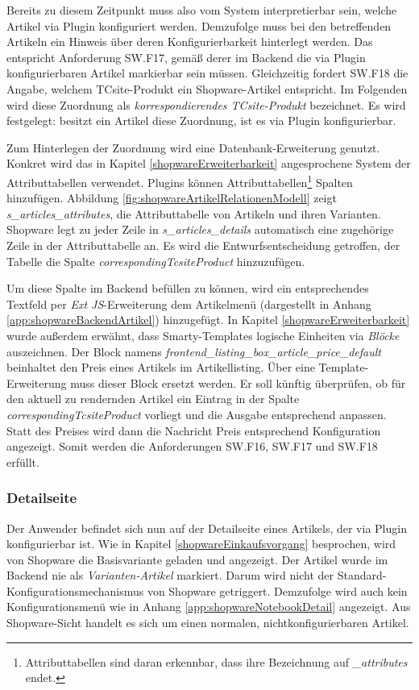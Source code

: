 \documentclass[11pt, a4paper, titlepage, listof=totoc, bibliography=totoc, index=totoc, twoside, openright, headings=normal]{scrreprt}
\begin{document}
Bereits zu diesem Zeitpunkt muss also vom System interpretierbar sein, welche Artikel via Plugin konfiguriert werden. Demzufolge muss bei den betreffenden Artikeln ein Hinweis über deren \glqq Konfigurierbarkeit\grqq{} hinterlegt werden. Das entspricht Anforderung SW.F17, gemäß derer im Backend die via Plugin konfigurierbaren Artikel markierbar sein müssen. Gleichzeitig fordert SW.F18 die Angabe, welchem TCsite-Produkt ein Shopware-Artikel entspricht. Im Folgenden wird diese Zuordnung als \emph{korrespondierendes TCsite-Produkt} bezeichnet. Es wird festgelegt: besitzt ein Artikel diese Zuordnung, ist es via Plugin konfigurierbar.

Zum Hinterlegen der Zuordnung wird eine Datenbank-Erweiterung genutzt. Konkret wird das in Kapitel \ref{shopwareErweiterbarkeit} angesprochene System der Attributtabellen verwendet. Plugins können Attributtabellen\footnote{Attributtabellen sind daran erkennbar, dass ihre Bezeichnung auf \emph{\_attributes} endet.} Spalten hinzufügen. Abbildung \ref{fig:shopwareArtikelRelationenModell} zeigt \emph{s\_articles\_attributes}, die Attributtabelle von Artikeln und ihren Varianten. Shopware legt zu jeder Zeile in \emph{s\_articles\_details} automatisch eine zugehörige Zeile in der Attributtabelle an. Es wird die Entwurfsentscheidung getroffen, der Tabelle die Spalte \emph{correspondingTcsiteProduct} hinzuzufügen.

Um diese Spalte im Backend befüllen zu können, wird ein entsprechendes Textfeld per \emph{Ext JS}-Erweiterung dem Artikelmenü (dargestellt in Anhang \ref{app:shopwareBackendArtikel}) hinzugefügt. In Kapitel \ref{shopwareErweiterbarkeit} wurde außerdem erwähnt, dass Smarty-Templates logische Einheiten via \emph{Blöcke} auszeichnen. Der Block namens \emph{frontend\_listing\_box\_article\_price\_default} beinhaltet den Preis eines Artikels im Artikellisting.  Über eine Template-Erweiterung muss dieser Block ersetzt werden. Er soll künftig überprüfen, ob für den aktuell zu rendernden Artikel ein Eintrag in der Spalte \emph{correspondingTcsiteProduct} vorliegt und die Ausgabe entsprechend anpassen. Statt des Preises wird dann die Nachricht \glqq Preis entsprechend Konfiguration\grqq{} angezeigt. Somit werden die Anforderungen SW.F16, SW.F17 und SW.F18 erfüllt.

\subsubsection*{Detailseite}
Der Anwender befindet sich nun auf der Detailseite eines Artikels, der via Plugin konfigurierbar ist. Wie in Kapitel \ref{shopwareEinkaufsvorgang} besprochen, wird von Shopware die Basisvariante geladen und angezeigt. Der Artikel wurde im Backend nie als \emph{Varianten-Artikel} markiert. Darum wird nicht der Standard-Konfigurationsmechanismus von Shopware getriggert. Demzufolge wird  auch kein Konfigurationsmenü wie in Anhang \ref{app:shopwareNotebookDetail} angezeigt. Aus Shopware-Sicht handelt es sich um einen normalen, nichtkonfigurierbaren Artikel.
\end{document}
